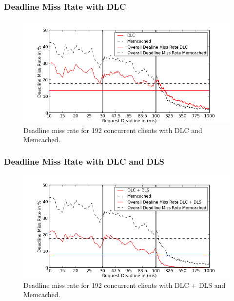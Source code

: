 \documentclass{beamer}
\begin{document}
\begin{frame}
  \frametitle{Deadline Miss Rate with DLC}
  \begin{figure}[t]
    \begin{center}
      \centerline{\includegraphics[scale=0.5]{img/EC2/EC2_CS_MM/miss_48.png}}
      \caption{Deadline miss rate for 192 concurrent clients with DLC and Memcached.}
      \label{fig:miss_192_cs_mm}
    \end{center}
  \end{figure}
\end{frame}


\begin{frame}
  \frametitle{Deadline Miss Rate with DLC and DLS}
  \begin{figure}[t]
    \begin{center}
      \centerline{\includegraphics[scale=0.5]{img/EC2/EC2_SH_MM/miss_48.png}}
      \caption{Deadline miss rate for 192 concurrent clients with DLC + DLS and Memcached.}
      \label{fig:miss_192_sh_mm}
    \end{center}
  \end{figure}
\end{frame}

\end{document}
